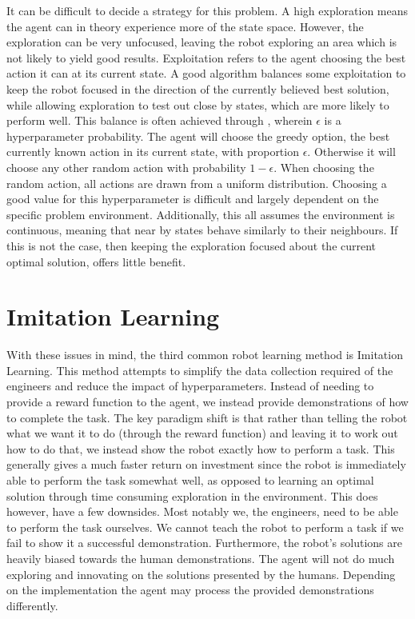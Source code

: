 It can be difficult to decide a strategy for this  problem. A high exploration means the agent can in theory experience more of the state space. However, the exploration can be very unfocused, leaving the robot exploring an area which is not likely to yield good results. Exploitation refers to the agent choosing the best action it can at its current state. A good algorithm balances some exploitation to keep the robot focused in the direction of the currently believed best solution, while allowing exploration to test out close by states, which are more likely to perform well. This balance is often achieved through , wherein $\epsilon$ is a hyperparameter probability. The agent will choose the greedy option, the best currently known action in its current state, with proportion $\epsilon$. Otherwise it will choose any other random action with probability $1-\epsilon$. When choosing the random action, all actions are drawn from a uniform distribution. Choosing a good value for this hyperparameter is difficult and largely dependent on the specific problem environment. Additionally, this all assumes the environment is continuous, meaning that near by states behave similarly to their neighbours. If this is not the case, then keeping the exploration focused about the current optimal solution, offers little benefit.

\section{Imitation Learning}
\label{sec:imitation-learning}
With these issues in mind, the third common robot learning method is Imitation Learning. This method attempts to simplify the data collection required of the engineers and reduce the impact of hyperparameters. Instead of needing to provide a reward function to the agent, we instead provide demonstrations of how to complete the task. The key paradigm shift is that rather than telling the robot what we want it to do (through the reward function) and leaving it to work out how to do that, we instead show the robot exactly how to perform a task. This generally gives a much faster return on investment since the robot is immediately able to perform the task somewhat well, as opposed to learning an optimal solution through time consuming exploration in the environment. This does however, have a few downsides. Most notably we, the engineers, need to be able to perform the task ourselves. We cannot teach the robot to perform a task if we fail to show it a successful demonstration. Furthermore, the robot's solutions are heavily biased towards the human demonstrations. The agent will not do much exploring and innovating on the solutions presented by the humans. Depending on the implementation the agent may process the provided demonstrations differently.


